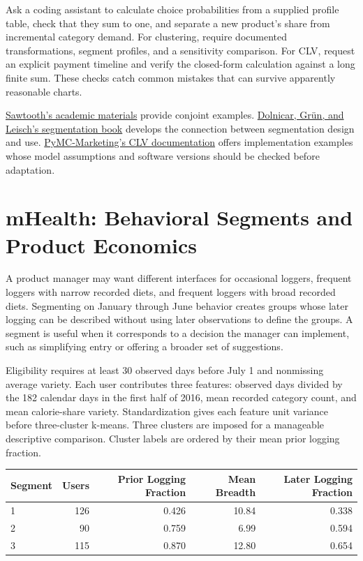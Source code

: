 \noindent Ask a coding assistant to calculate choice probabilities from a supplied
profile table, check that they sum to one, and separate a new product's
share from incremental category demand. For clustering, require
documented transformations, segment profiles, and a sensitivity
comparison. For CLV, request an explicit payment timeline and verify the
closed-form calculation against a long finite sum. These checks catch
common mistakes that can survive apparently reasonable charts.

\href{https://sawtoothsoftware.com/academics/teaching-resources}{Sawtooth's
academic materials} provide conjoint examples.
\href{https://link.springer.com/book/10.1007/978-981-10-8818-6}{Dolnicar,
Grün, and Leisch's segmentation book} develops the connection between
segmentation design and use.
\href{https://www.pymc-marketing.io/en/latest/notebooks/clv/clv_quickstart.html}{PyMC-Marketing's
CLV documentation} offers implementation examples whose model
assumptions and software versions should be checked before adaptation.

\hypertarget{M04-mhealth-behavioral-segments-and-product-economics}{%
\section{mHealth: Behavioral Segments and Product
Economics}\label{M04-mhealth-behavioral-segments-and-product-economics}}

\noindent A product manager may want different interfaces for occasional loggers,
frequent loggers with narrow recorded diets, and frequent loggers with
broad recorded diets. Segmenting on January through June behavior
creates groups whose later logging can be described without using later
observations to define the groups. A segment is useful when it
corresponds to a decision the manager can implement, such as simplifying
entry or offering a broader set of suggestions.

Eligibility requires at least 30 observed days before July 1 and
nonmissing average variety. Each user contributes three features:
observed days divided by the 182 calendar days in the first half of
2016, mean recorded category count, and mean calorie-share variety.
Standardization gives each feature unit variance before three-cluster
k-means. Three clusters are imposed for a manageable descriptive
comparison. Cluster labels are ordered by their mean prior logging
fraction.

\begin{table}[H]
\centering\small
\begin{tabular}{@{}lrrrr@{}}
\toprule
Segment & Users & Prior Logging Fraction & Mean Breadth & Later Logging
Fraction \\
\midrule

1 & 126 & 0.426 & 10.84 & 0.338 \\
2 & 90 & 0.759 & 6.99 & 0.594 \\
3 & 115 & 0.870 & 12.80 & 0.654 \\
\bottomrule
\end{tabular}
\end{table}


